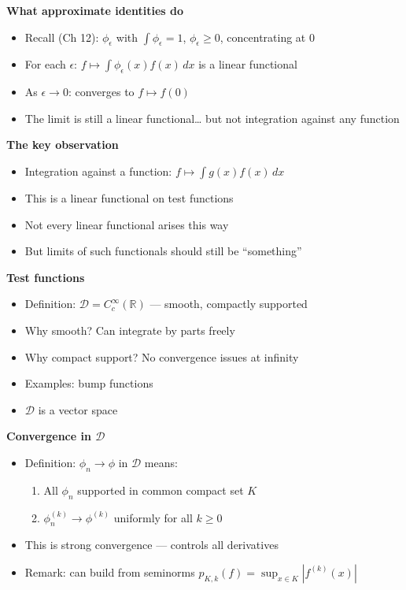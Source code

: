 \documentclass[
  10pt,
  letterpaper,
]{scrbook}
\providecommand{\tightlist}{%
  \setlength{\itemsep}{0pt}\setlength{\parskip}{0pt}}
\begin{document}
\textbf{What approximate identities do}

\begin{itemize}
\tightlist
\item
  Recall (Ch 12): \(\phi_\epsilon\) with \(\int \phi_\epsilon = 1\),
  \(\phi_\epsilon \geq 0\), concentrating at 0
\item
  For each \(\epsilon\): \(f \mapsto \int \phi_\epsilon(x) f(x)\, dx\)
  is a linear functional
\item
  As \(\epsilon \to 0\): converges to \(f \mapsto f(0)\)
\item
  The limit is still a linear functional\ldots{} but not integration
  against any function
\end{itemize}

\textbf{The key observation}

\begin{itemize}
\tightlist
\item
  Integration against a function: \(f \mapsto \int g(x) f(x)\, dx\)
\item
  This is a linear functional on test functions
\item
  Not every linear functional arises this way
\item
  But limits of such functionals should still be ``something''
\end{itemize}

\textbf{Test functions}

\begin{itemize}
\tightlist
\item
  Definition: \(\mathcal{D} = C_c^\infty(\mathbb{R})\) --- smooth,
  compactly supported
\item
  Why smooth? Can integrate by parts freely
\item
  Why compact support? No convergence issues at infinity
\item
  Examples: bump functions
\item
  \(\mathcal{D}\) is a vector space
\end{itemize}

\textbf{Convergence in \(\mathcal{D}\)}

\begin{itemize}
\tightlist
\item
  Definition: \(\phi_n \to \phi\) in \(\mathcal{D}\) means:

  \begin{enumerate}
  \def\labelenumi{\arabic{enumi}.}
  \tightlist
  \item
    All \(\phi_n\) supported in common compact set \(K\)
  \item
    \(\phi_n^{(k)} \to \phi^{(k)}\) uniformly for all \(k \geq 0\)
  \end{enumerate}
\item
  This is strong convergence --- controls all derivatives
\item
  Remark: can build from seminorms
  \(p_{K,k}(f) = \sup_{x \in K} |f^{(k)}(x)|\)
\end{itemize}
\end{document}
